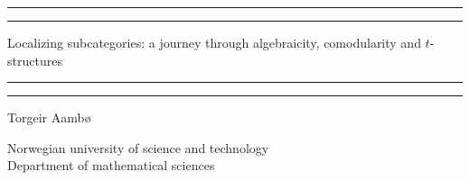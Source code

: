 
\begin{titlingpage}



    \vspace*{5cm}

    \rule[-11pt]{\textwidth}{1pt}
    \rule{\textwidth}{0.5pt}

    \begin{center}
    \Huge Localizing subcategories: a journey through algebraicity, comodularity and $t$-structures
    \end{center}

    \rule{\textwidth}{0.5pt}
    \rule[11pt]{\textwidth}{1pt}


    \begin{center}
    Torgeir Aambø
    \end{center}



    \vspace{\fill}


    \begin{center}
        Norwegian university of science and technology \\
        Department of mathematical sciences 
    \end{center}


\end{titlingpage}